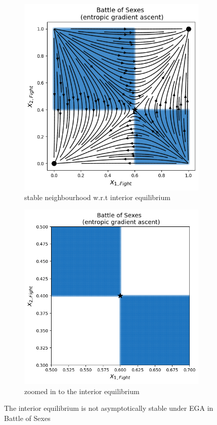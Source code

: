 \begin{figure}[H]
\captionsetup{justification=centering}
\centering
\begin{subfigure}{.49\textwidth}
    \centering
    \includegraphics[width=\textwidth]{logos/BattleOfSexes6.png}
    \caption{stable neighbourhood w.r.t interior equilibrium}
    \label{fig:BOS3a}
\end{subfigure}%
\begin{subfigure}{.51\textwidth}
    \centering
    \includegraphics[width=\textwidth]{logos/BattleOfSexes5.png}
    \caption{zoomed in to the interior equilibrium}
    \label{fig:BOS3b}
\end{subfigure}
\caption{The interior equilibrium is not asymptotically stable under EGA in Battle of Sexes}
\label{fig:BOS3}
\end{figure}


